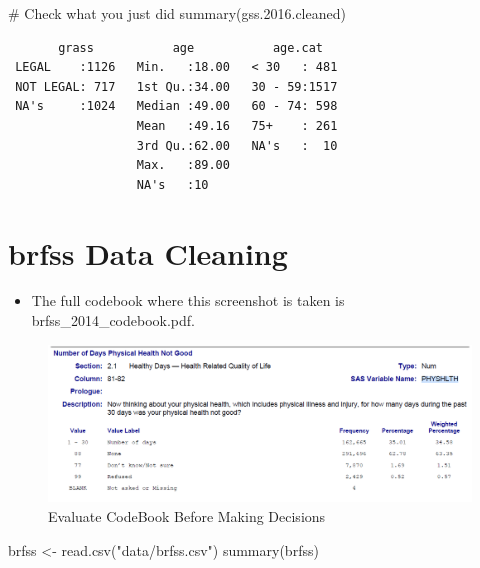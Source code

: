 \documentclass[
  letterpaper,
  DIV=11,
  numbers=noendperiod]{scrreprt}
\newenvironment{Shaded}{\begin{snugshade}}{\end{snugshade}}
\newcommand{\CommentTok}[1]{\textcolor[rgb]{0.37,0.37,0.37}{#1}}
\newcommand{\FloatTok}[1]{\textcolor[rgb]{0.68,0.00,0.00}{#1}}
\newcommand{\FunctionTok}[1]{\textcolor[rgb]{0.28,0.35,0.67}{#1}}
\newcommand{\NormalTok}[1]{\textcolor[rgb]{0.00,0.23,0.31}{#1}}
\newcommand{\OtherTok}[1]{\textcolor[rgb]{0.00,0.23,0.31}{#1}}
\newcommand{\StringTok}[1]{\textcolor[rgb]{0.13,0.47,0.30}{#1}}
\providecommand{\tightlist}{%
  \setlength{\itemsep}{0pt}\setlength{\parskip}{0pt}}\usepackage{longtable,booktabs,array}
\begin{document}
\begin{itemize}
\begin{Shaded}
\begin{Highlighting}[]
\CommentTok{\# Check what you just did}
\FunctionTok{summary}\NormalTok{(gss.}\FloatTok{2016.}\NormalTok{cleaned)}
\end{Highlighting}
\end{Shaded}

\begin{verbatim}
       grass           age           age.cat    
 LEGAL    :1126   Min.   :18.00   < 30   : 481  
 NOT LEGAL: 717   1st Qu.:34.00   30 - 59:1517  
 NA's     :1024   Median :49.00   60 - 74: 598  
                  Mean   :49.16   75+    : 261  
                  3rd Qu.:62.00   NA's   :  10  
                  Max.   :89.00                 
                  NA's   :10                    
\end{verbatim}
\end{itemize}

\section{brfss Data Cleaning}\label{brfss-data-cleaning}

\begin{itemize}
\tightlist
\item
  The full codebook where this screenshot is taken is
  brfss\_2014\_codebook.pdf.
\end{itemize}

\begin{figure}[H]

{\centering \includegraphics{Pictures/Ch2/CodeBookPHYSHLTH.png}

}

\caption{Evaluate CodeBook Before Making Decisions}

\end{figure}%

\begin{Shaded}
\begin{Highlighting}[]
\NormalTok{brfss }\OtherTok{\textless{}{-}} \FunctionTok{read.csv}\NormalTok{(}\StringTok{"data/brfss.csv"}\NormalTok{)}
\FunctionTok{summary}\NormalTok{(brfss)}
\end{Highlighting}
\end{Shaded}
\end{document}
